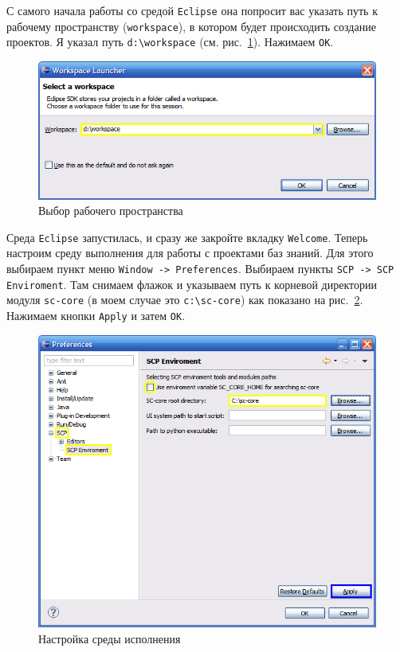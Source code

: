 С самого начала работы со средой \texttt{Eclipse} она попросит вас
указать путь к рабочему пространству (\texttt{workspace}), в котором
будет происходить создание проектов. Я указал путь \verb|d:\workspace|
(см. рис.~\ref{fig:Setup_Select_workspace}). Нажимаем \texttt{OK}.

\begin{figure}[h!]
  \centering
  \includegraphics[scale=0.7]{images/5/setup/1_Select_workspace}
  \caption{Выбор рабочего пространства}
  \label{fig:Setup_Select_workspace}
\end{figure}

Среда \texttt{Eclipse} запустилась, и сразу же закройте вкладку
\texttt{Welcome}. Теперь настроим среду выполнения для работы с
проектами баз знаний. Для этого выбираем пункт меню \texttt{Window ->
  Preferences}. Выбираем пункты \texttt{SCP -> SCP Enviroment}. Там
снимаем флажок и указываем путь к корневой директории модуля
\texttt{sc-core} (в моем случае это \verb|c:\sc-core|) как показано на
рис.~\ref{fig:Setup_Setup_scp_enviroment}. Нажимаем кнопки
\texttt{Apply} и затем \texttt{OK}.

\begin{figure}[h!]
  \centering
  \includegraphics[scale=0.7]{images/5/setup/2_Setup_scp_enviroment}
  \caption{Настройка среды исполнения}
  \label{fig:Setup_Setup_scp_enviroment}
\end{figure}


